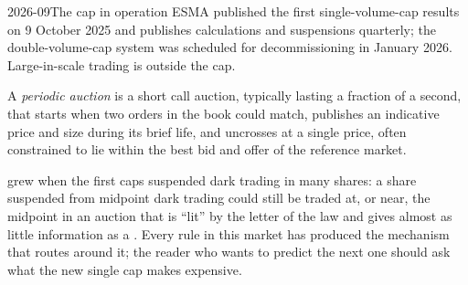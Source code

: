 \begin{dated}{2026-09}{The cap in operation}\label{dat:m1:european-equity-market-structure:svc}
ESMA published the first single-volume-cap results on 9 October 2025 and
publishes calculations and suspensions quarterly; the double-volume-cap
system was scheduled for decommissioning in January 2026. Large-in-scale
trading is outside the cap.
\end{dated}

\begin{definition}\label{def:m1:european-equity-market-structure:periodic}
A \emph{periodic auction} is a short call auction,
typically lasting a fraction of a second, that starts when two orders in the
book could match, publishes an indicative price and size during its brief
life, and uncrosses at a single price, often constrained to lie within the
best bid and offer of the reference market.
\end{definition}

 grew when the first caps suspended dark trading in many
shares: a share suspended from midpoint dark trading could still be traded at, or
near, the midpoint in an auction that is ``lit'' by the letter of the law and
gives almost as little information as a . Every rule in this market
has produced the mechanism that routes around it; the reader who wants to
predict the next one should ask what the new single cap makes expensive.

